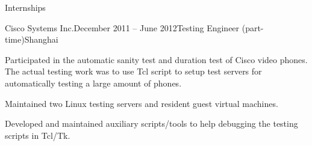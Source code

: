\documentclass{resume} %
\begin{document}
\begin{rSection}{Internships}
\begin{rSubsection}{Cisco Systems Inc.}{December 2011 -- June 2012}{Testing Engineer (part-time)}{Shanghai}
    \item Participated in the automatic sanity test and duration test of Cisco
        video phones. The actual testing work was to use Tcl script to
        setup test servers for automatically testing a large amount of phones.

    \item Maintained two Linux testing servers and resident guest virtual
        machines.

    \item Developed and maintained auxiliary scripts/tools to help debugging
        the testing scripts in Tcl/Tk.

    \end{rSubsection}

\end{rSection}
\end{document}

